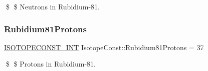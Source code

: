 \$ \$ Neutrons in Rubidium-\/81. \mbox{\label{group___isotope_const-_rubidium-_rb81_ga9960bf78cdedad395723a3283394822f}} 
\subsubsection{\texorpdfstring{Rubidium81\+Protons}{Rubidium81Protons}}
{\footnotesize\ttfamily \mbox{\hyperlink{group___isotope_const-_macros_ga5f18360b3e99483a35c32d789e62621c}{I\+S\+O\+T\+O\+P\+E\+C\+O\+N\+S\+T\+\_\+\+I\+NT}} Isotope\+Const\+::\+Rubidium81\+Protons = 37}

\$ \$ Protons in Rubidium-\/81. 